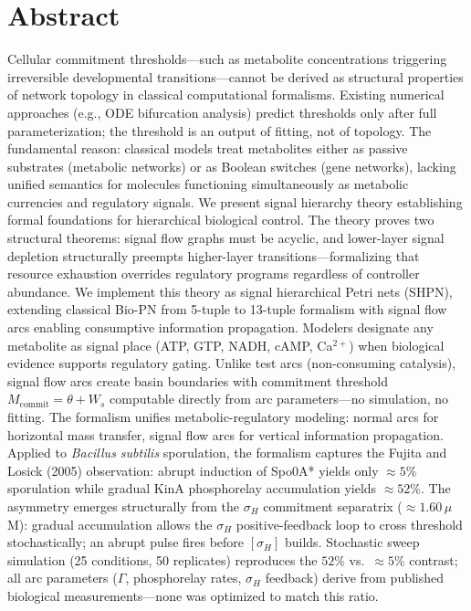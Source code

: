 \documentclass[10pt,letterpaper]{article}
\begin{document}
\section*{Abstract}
Cellular commitment thresholds---such as metabolite concentrations triggering irreversible developmental transitions---cannot be derived as structural properties of network topology in classical computational formalisms. Existing numerical approaches (e.g., ODE bifurcation analysis) predict thresholds only after full parameterization; the threshold is an output of fitting, not of topology. The fundamental reason: classical models treat metabolites either as passive substrates (metabolic networks) or as Boolean switches (gene networks), lacking unified semantics for molecules functioning simultaneously as metabolic currencies and regulatory signals. We present signal hierarchy theory establishing formal foundations for hierarchical biological control. The theory proves two structural theorems: signal flow graphs must be acyclic, and lower-layer signal depletion structurally preempts higher-layer transitions---formalizing that resource exhaustion overrides regulatory programs regardless of controller abundance. We implement this theory as signal hierarchical Petri nets (SHPN), extending classical Bio-PN from 5-tuple to 13-tuple formalism with signal flow arcs enabling consumptive information propagation. Modelers designate any metabolite as signal place (ATP, GTP, NADH, cAMP, Ca$^{2+}$) when biological evidence supports regulatory gating. Unlike test arcs (non-consuming catalysis), signal flow arcs create basin boundaries with commitment threshold $M_{\text{commit}} = \theta + W_s$ computable directly from arc parameters---no simulation, no fitting. The formalism unifies metabolic-regulatory modeling: normal arcs for horizontal mass transfer, signal flow arcs for vertical information propagation. Applied to \textit{Bacillus subtilis} sporulation, the formalism captures the Fujita and Losick (2005) observation: abrupt induction of Spo0A* yields only $\approx 5\%$ sporulation while gradual KinA phosphorelay accumulation yields $\approx 52\%$. The asymmetry emerges structurally from the $\sigma_H$ commitment separatrix ($\approx 1.60\,\mu$M): gradual accumulation allows the $\sigma_H$ positive-feedback loop to cross threshold stochastically; an abrupt pulse fires before $[\sigma_H]$ builds. Stochastic sweep simulation (25 conditions, 50 replicates) reproduces the $52\%$ vs.\ $\approx 5\%$ contrast; all arc parameters ($\Gamma$, phosphorelay rates, $\sigma_H$ feedback) derive from published biological measurements---none was optimized to match this ratio.
\end{document}
